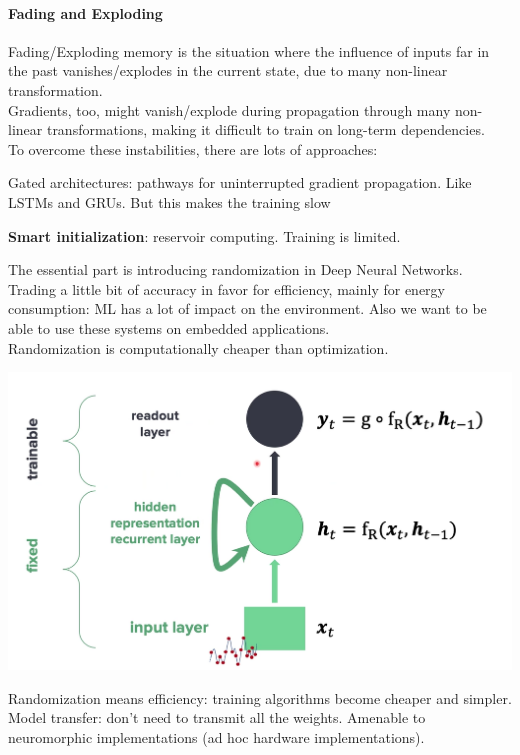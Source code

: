 \documentclass[10pt]{report}
\begin{document}
\paragraph{Fading and Exploding} Fading/Exploding memory is the situation where the influence of inputs far in the past vanishes/explodes in the current state, due to many non-linear transformation.\\
Gradients, too, might vanish/explode during propagation through many non-linear transformations, making it difficult to train on long-term dependencies.\\
To overcome these instabilities, there are lots of approaches:
\begin{list}{}{}
	\item Gated architectures: pathways for uninterrupted gradient propagation. Like LSTMs and GRUs. But this makes the training slow
	\item \textbf{Smart initialization}: reservoir computing. Training is limited.
\end{list}
The essential part is introducing randomization in Deep Neural Networks. Trading a little bit of accuracy in favor for efficiency, mainly for energy consumption: ML has a lot of impact on the environment. Also we want to be able to use these systems on embedded applications.\\
Randomization is computationally cheaper than optimization.
\begin{center}
	\includegraphics[scale=0.5]{102.png}
\end{center}
Randomization means efficiency: training algorithms become cheaper and simpler. Model transfer: don't need to transmit all the weights. Amenable to neuromorphic implementations (ad hoc hardware implementations).
\pagebreak
\end{document}
